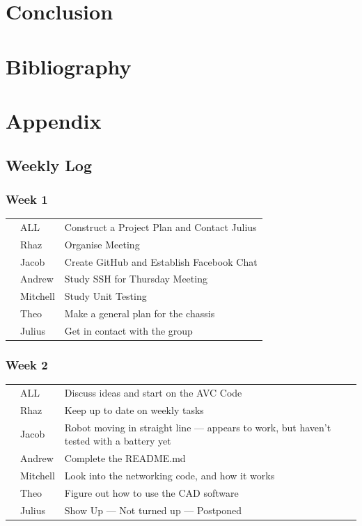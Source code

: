 \documentclass[paper=a4, fontsize=11pt]{scrartcl} %
\def\checkmark{\tikz\fill[scale=0.4] (0,.35) -- (.25,0) -- (1,.7) -- (.25,.15) -- cycle;}
\def\scalecheck{\resizebox{\widthof{\checkmark}*\ratio{\widthof{x}}{\widthof{\normalsize x}}}{!}{\checkmark}}
\numberwithin{equation}{section} %
\numberwithin{figure}{section} %
\begin{document}
\section{Conclusion}

\section{Bibliography}
\printbibliography

\section{Appendix}

\subsection{Weekly Log}

\subsubsection*{Week 1}
\begin{tabularx}{\textwidth}{clX}
\scalecheck & ALL      & Construct a Project Plan and Contact Julius\\
\scalecheck & Rhaz     & Organise Meeting\\
\scalecheck & Jacob    & Create GitHub and Establish Facebook Chat\\
\scalecheck & Andrew   & Study SSH for Thursday Meeting\\
\scalecheck & Mitchell & Study Unit Testing\\
\scalecheck & Theo     & Make a general plan for the chassis\\
\scalecheck & Julius   & Get in contact with the group
\end{tabularx}

\subsubsection*{Week 2}
\begin{tabularx}{\textwidth}{clX}
\scalecheck  & ALL      & Discuss ideas and start on the AVC Code\\
\scalecheck  & Rhaz     & Keep up to date on weekly tasks\\
& Jacob    & Robot moving in straight line --- appears to work, but haven't tested with a battery yet\\
\scalecheck  & Andrew   & Complete the README.md\\
\scalecheck  & Mitchell & Look into the networking code, and how it works\\
\scalecheck  & Theo     & Figure out how to use the CAD software\\
& Julius   & Show Up --- Not turned up --- Postponed\\
\end{tabularx}
\end{document}
